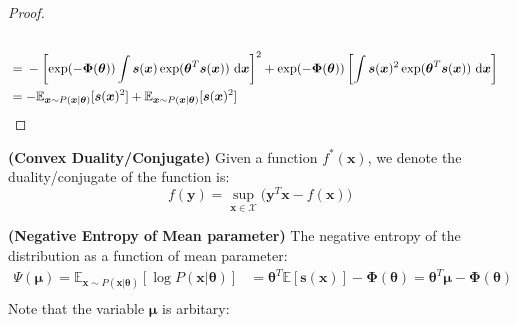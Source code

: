 \begin{proof}
\begin{equation*}
\begin{aligned}
\begin{aligned}[t]
        \end{aligned} \\
        &=\begin{aligned}[t]
            &-\left[ \exp(-\boldsymbol \Phi(\boldsymbol \theta))  \int \boldsymbol s(\boldsymbol x)\exp(\boldsymbol \theta^T\boldsymbol s(\boldsymbol x))\ \mathrm{d} \boldsymbol x  \right]^2+ \exp(-\boldsymbol \Phi(\boldsymbol \theta))\left[ \int \boldsymbol s(\boldsymbol x)^2\exp(\boldsymbol \theta^T\boldsymbol s(\boldsymbol x))\ \mathrm{d} \boldsymbol x  \right] \\
        \end{aligned} \\
        &= - \mathbb{E}_{\boldsymbol x \sim P(\boldsymbol x |\boldsymbol \theta)}[\boldsymbol s(\boldsymbol x)^2] + \mathbb{E}_{\boldsymbol x \sim P(\boldsymbol x|\boldsymbol \theta)}[\boldsymbol s(\boldsymbol x)^2]
    \end{aligned}
    \end{equation*}
\end{proof}

\begin{definition}{\textbf{(Convex Duality/Conjugate)}}
    Given a function $f^*(\boldsymbol x)$, we denote the duality/conjugate of the function is:
    \begin{equation*}
        f(\boldsymbol y) = \sup_{\boldsymbol x\in\mathcal{X}}\Big( \boldsymbol y^T\boldsymbol x - f(\boldsymbol x) \Big)
    \end{equation*}
\end{definition}

\begin{definition}{\textbf{(Negative Entropy of Mean parameter)}}
    The negative entropy of the distribution as a function of mean parameter: 
    \begin{equation*}
    \begin{aligned}
        \Psi(\boldsymbol \mu) = \mathbb{E}_{\boldsymbol x \sim P(\boldsymbol x|\boldsymbol \theta)}[\log P(\boldsymbol x | \boldsymbol \theta )] &= \boldsymbol \theta^T \mathbb{E}[\boldsymbol s(\boldsymbol x)] - \boldsymbol \Phi(\boldsymbol \theta) = \boldsymbol \theta^T \boldsymbol \mu - \boldsymbol \Phi(\boldsymbol \theta) \\
    \end{aligned}
    \end{equation*}
    Note that the variable $\boldsymbol \mu$ is arbitary:
\end{definition}

